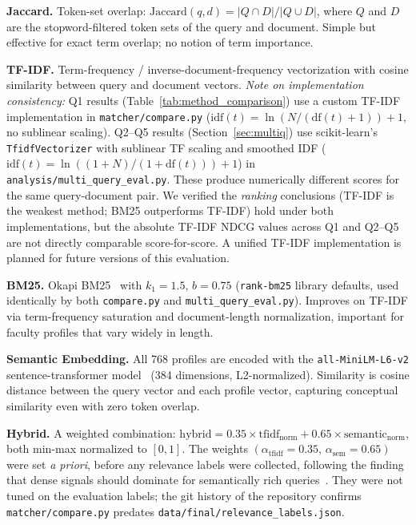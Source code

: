 \documentclass[11pt,a4paper]{article}
\begin{document}
\textbf{Jaccard.} Token-set overlap:
$\text{Jaccard}(q, d) = |Q \cap D| / |Q \cup D|$,
where $Q$ and $D$ are the stopword-filtered token sets of the query and
document. Simple but effective for exact term overlap; no notion of term
importance.

\textbf{TF-IDF.} Term-frequency / inverse-document-frequency vectorization
with cosine similarity between query and document vectors.
\emph{Note on implementation consistency:} Q1 results (Table~\ref{tab:method_comparison})
use a custom TF-IDF implementation in \texttt{matcher/compare.py}
($\text{idf}(t) = \ln(N/(\text{df}(t)+1)) + 1$, no sublinear scaling).
Q2--Q5 results (Section~\ref{sec:multiq}) use scikit-learn's
\texttt{TfidfVectorizer} with sublinear TF scaling and smoothed IDF
($\text{idf}(t) = \ln((1+N)/(1+\text{df}(t))) + 1$) in
\texttt{analysis/multi\_query\_eval.py}. These produce numerically
different scores for the same query-document pair. We verified the
\emph{ranking} conclusions (TF-IDF is the weakest method; BM25 outperforms
TF-IDF) hold under both implementations, but the absolute TF-IDF NDCG values
across Q1 and Q2--Q5 are not directly comparable score-for-score. A unified
TF-IDF implementation is planned for future versions of this evaluation.

\textbf{BM25.} Okapi BM25~\cite{robertson2009} with $k_1=1.5$, $b=0.75$
(\texttt{rank-bm25} library defaults, used identically by both
\texttt{compare.py} and \texttt{multi\_query\_eval.py}). Improves on TF-IDF
via term-frequency saturation and document-length normalization, important
for faculty profiles that vary widely in length.

\textbf{Semantic Embedding.} All 768 profiles are encoded with the
\texttt{all-MiniLM-L6-v2} sentence-transformer model~\cite{reimers2019}
(384 dimensions, L2-normalized). Similarity is cosine distance between the
query vector and each profile vector, capturing conceptual similarity even
with zero token overlap.

\textbf{Hybrid.} A weighted combination:
$\text{hybrid} = 0.35 \times \text{tfidf}_{\text{norm}} + 0.65 \times \text{semantic}_{\text{norm}}$,
both min-max normalized to $[0,1]$. The weights
$(\alpha_{\text{tfidf}}=0.35,\, \alpha_{\text{sem}}=0.65)$ were set
\emph{a priori}, before any relevance labels were collected, following the
finding that dense signals should dominate for semantically rich
queries~\cite{lin2021few,luan2021sparse}. They were not tuned on the
evaluation labels; the git history of the repository confirms
\texttt{matcher/compare.py} predates \texttt{data/final/relevance\_labels.json}.
\end{document}
